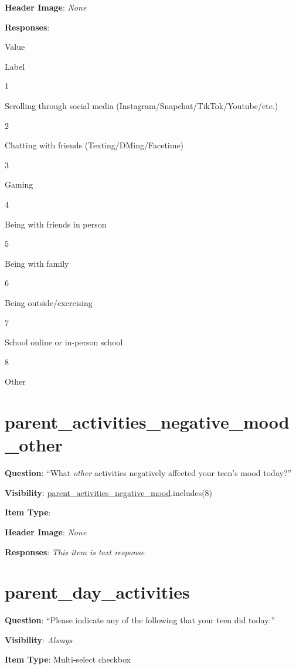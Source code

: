 \documentclass[]{book}
\begin{document}
\textbf{Header Image}: \emph{None}

\textbf{Responses}:

Value

Label

1

Scrolling through social media (Instagram/Snapchat/TikTok/Youtube/etc.)

2

Chatting with friends (Texting/DMing/Facetime)

3

Gaming

4

Being with friends in person

5

Being with family

6

Being outside/exercising

7

School online or in-person school

8

Other

\hypertarget{parent_activities_negative_mood_other}{%
\section{parent\_activities\_negative\_mood\_other}\label{parent_activities_negative_mood_other}}

\textbf{Question}: ``What \emph{other} activities negatively affected your teen's mood today?''

\textbf{Visibility}: \protect\hyperlink{parent_activities_negative_mood}{parent\_activities\_negative\_mood}.includes(8)

\textbf{Item Type}:

\textbf{Header Image}: \emph{None}

\textbf{Responses}: \emph{This item is text response}

\hypertarget{parent_day_activities}{%
\section{parent\_day\_activities}\label{parent_day_activities}}

\textbf{Question}: ``Please indicate any of the following that your teen did today:''

\textbf{Visibility}: \emph{Always}

\textbf{Item Type}: Multi-select checkbox
\end{document}
